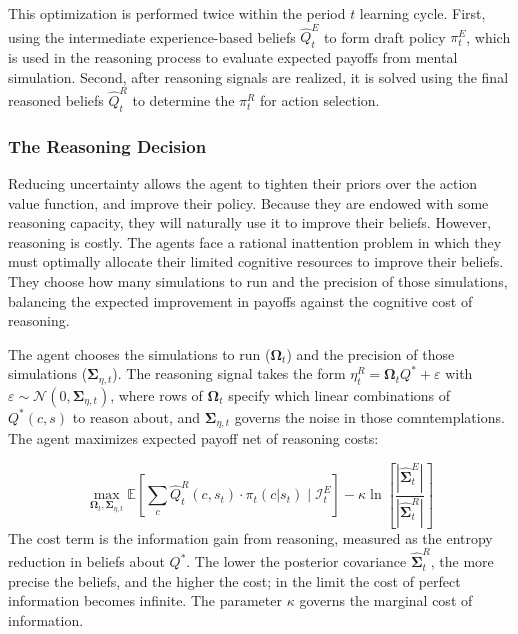 This optimization is performed twice within the period $t$ learning cycle. First, 
using the intermediate experience-based beliefs $\hat{Q}^E_t$ to form draft policy $\pi^E_t$,
which is used in the reasoning process to evaluate expected payoffs from mental simulation.
Second, after reasoning signals are realized, it is solved using the final reasoned beliefs $\hat{Q}^R_t$ 
to determine the $\pi^R_t$ for action selection.

\subsubsection{The Reasoning Decision}\label{sec:reasoning-decision}

Reducing uncertainty allows the agent to tighten their priors over the action value function,
and improve their policy. Because they are endowed with some reasoning capacity, they
will naturally use it to improve their beliefs. However, reasoning is costly.
The agents face a rational inattention problem \citep{Sims2003} in which they must optimally allocate their limited
cognitive resources to improve their beliefs. They choose how many simulations to run
and the precision of those simulations, balancing the expected improvement in payoffs
against the cognitive cost of reasoning.

The agent chooses the simulations to run ($\boldsymbol{\Omega}_t$) and the precision of 
those simulations ($\boldsymbol{\Sigma}_{\eta, t}$). The reasoning signal takes the 
form $\eta^R_t = \boldsymbol{\Omega}_t Q^* + \varepsilon$ with $\varepsilon 
\sim \mathcal{N}(0, \boldsymbol{\Sigma}_{\eta,t})$, where rows of $\boldsymbol{\Omega}_t$ 
specify which linear combinations of $Q^*(c,s)$ to reason about, and $\boldsymbol{\Sigma}_{\eta,t}$ 
governs the noise in those comntemplations. The agent maximizes expected payoff net of reasoning costs:

\begin{equation}
\max_{\boldsymbol{\Omega}_t, \boldsymbol{\Sigma}_{\eta, t}} \mathbb{E}\left[ \sum_c \hat{Q}^R_t(c, s_t) \cdot \pi_t(c | s_t) \mid \mathcal{I}^E_t \right] - \kappa \ln\left[\frac{|\hat{\boldsymbol{\Sigma}}^E_t|}{|\hat{\boldsymbol{\Sigma}}^R_t|}\right]
\end{equation}
The cost term is the information gain from reasoning, measured as the entropy reduction in beliefs about $Q^*$. The lower the posterior covariance $\hat{\boldsymbol{\Sigma}}^R_t$, the more precise the beliefs, and the higher the cost; in the limit the cost of perfect information becomes infinite. The parameter $\kappa$ governs the marginal cost of information.

